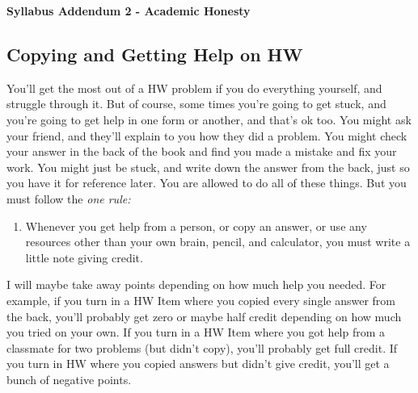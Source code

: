\documentclass[12pt, twoside]{article}
\begin{document}

\newpage
\begin{large}
\begin{center}
   \textbf{Syllabus Addendum 2 - Academic Honesty}
\end{center}
\end{large}

\subsection*{Copying and Getting Help on HW}

You'll get the most out of a HW problem if you do everything yourself, and struggle through it. But of course, some times you're going to get stuck, and you're going to get help in one form or another, and that's ok too. You might ask your friend, and they'll explain to you how they did a problem. You might check your answer in the back of the book and find you made a mistake and fix your work. You might just be stuck, and write down the answer from the back, just so you have it for reference later. You are allowed to do all of these things. But you must follow the \emph{one rule:}

\begin{enumerate}
   \item Whenever you get help from a person, or copy an answer, or use any resources other than your own brain, pencil, and calculator, you must write a little note giving credit.
\end{enumerate}

I will maybe take away points depending on how much help you needed. For example, if you turn in a HW Item where you copied every single answer from the back, you'll probably get zero or maybe half credit depending on how much you tried on your own. If you turn in a HW Item where you got help from a classmate for two problems (but didn't copy), you'll probably get full credit. If you turn in HW where you copied answers but didn't give credit, you'll get a bunch of negative points.
\end{document}

